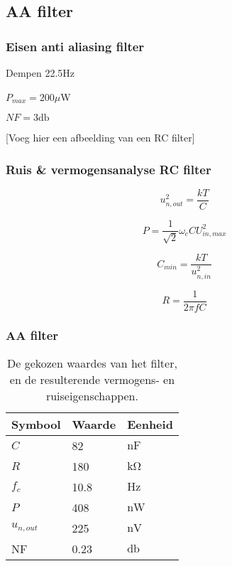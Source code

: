     \subsection*{AA filter}
    \begin{frame}
        \frametitle{Eisen anti aliasing filter}
        
        \centering

        Dempen 22.5Hz


        $P_{max}=200\mu$W


        $NF=3\si{\decibel}$

        [Voeg hier een afbeelding van een RC filter]
    
    \end{frame}
    \begin{frame}
        \frametitle{Ruis \& vermogensanalyse RC filter}
    
        \begin{equation}\label{eq:dividerNoise}
            u_{n,out}^2 = \frac{kT}{C}
        \end{equation}

        \begin{equation} \label{eq:filterPower}
            P = \frac{1}{\sqrt{2}}\omega_cCU_{in,max}^2
        \end{equation}

        \pause

        \begin{equation} \label{eq:filterCapMin}
            C_{min} = \frac{kT}{u_{n,in}^2}
        \end{equation}

        \begin{equation}
            R = \frac{1}{2\pi fC}
        \end{equation}
    
    \end{frame}
    \begin{frame}
        \frametitle{AA filter}
    
        \begin{table}[ht]
            \centering
            \begin{tabular}{l|l|l}
                Symbool & Waarde & Eenheid \\
                \hline
                $C$         & 82    & $\si{\nano\farad}$\\
                $R$         & 180   & $\si{\kilo\ohm}$  \\
                $f_c$       & 10.8  & $\si{\hertz}$     \\
                $P$         & 408   & $\si{\nano\watt}$ \\
                $u_{n,out}$ & 225   & $\si{\nano\volt}$ \\
                NF          & 0.23  & $\si{\decibel}$   \\
            \end{tabular}
            \caption{De gekozen waardes van het filter, en de resulterende vermogens- en ruiseigenschappen.}
            \label{tab:filterValues}
        \end{table}
    
    \end{frame}
